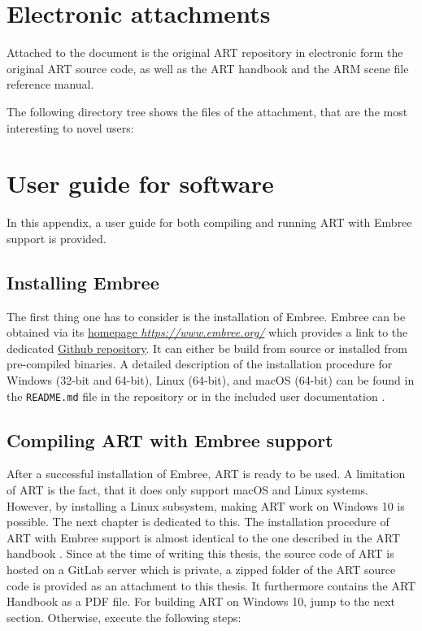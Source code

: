 \chapter{Electronic attachments} \label{chap:attachments}

Attached to the document is the original ART repository in electronic form the original ART source code, as well as the ART handbook and the ARM scene file reference manual. 

The following directory tree shows the files of the attachment, that are the most interesting to novel users:

\medspace


\chapter{User guide for software}

In this appendix, a user guide for both compiling and running ART with Embree support is provided. 

\section{Installing Embree}
\label{embree}
The first thing one has to consider is the installation of Embree. Embree can be obtained via its \href{https://www.embree.org/}{homepage \emph{https://www.embree.org/}} which provides a link to the dedicated \href{https://github.com/embree/embree}{Github repository}. It can either be build from source or installed from pre-compiled binaries. A detailed description of the installation procedure for Windows (32-bit and 64-bit), Linux (64-bit), and macOS (64-bit) can be found in the \texttt{README.md} file in the repository or in the included user documentation \cite{embree2021Doc}.

\section{Compiling ART with Embree support}
\label{art}
After a successful installation of Embree, ART is ready to be used. A limitation of ART is the fact, that it does only support macOS and Linux systems. However, by installing a Linux subsystem, making ART work on Windows 10 is possible. The next chapter is dedicated to this. 
The installation procedure of ART with Embree support is almost identical to the one described in the ART handbook \cite{arthandbook}. Since at the time of writing this thesis, the source code of ART is hosted on a GitLab server which is private, a zipped folder of the ART source code is provided as an attachment to this thesis. It furthermore contains the ART Handbook as a PDF file. For building ART on Windows 10, jump to the next section. Otherwise, execute the following steps:

